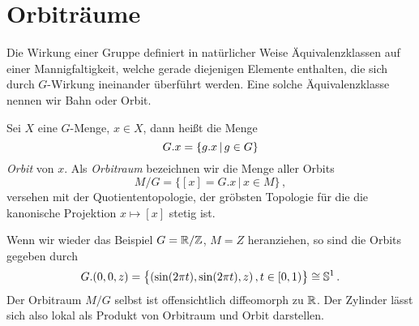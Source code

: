 \section{Orbiträume}
Die Wirkung einer Gruppe definiert in natürlicher
Weise Äquivalenzklassen auf einer Mannigfaltigkeit, welche gerade diejenigen
Elemente enthalten, die sich durch $G$-Wirkung ineinander überführt werden.
Eine solche Äquivalenzklasse nennen wir Bahn oder Orbit. 
\begin{definition}[Orbit]
Sei $X$ eine $G$-Menge, $x\in X$, dann heißt die Menge
\begin{equation}
G . x=\{g . x\,|\,g\in G\}
\end{equation}
\emph{Orbit} von $x$. Als \emph{Orbitraum} bezeichnen wir die Menge aller Orbits
\begin{equation}
M/G=\{[x]=G.x\,|\,x\in M\}\,,
\end{equation}
versehen mit der Quotiententopologie, der gröbsten Topologie für die die
kanonische Projektion $x\mapsto [x]$ stetig ist.
\end{definition}
\begin{beispiel}
Wenn wir wieder das Beispiel $G=\mathbb{R}/\mathbb{Z}$, $M=Z$ heranziehen, so sind die Orbits gegeben durch
\begin{equation}
G.(0,0,z)=\left\{(\sin (2\pi t),\sin (2\pi t),z)\,,t \in
[0,1)\right\}\cong\Sphere^1\,.
\end{equation}
Der Orbitraum $M/G$ selbst ist offensichtlich diffeomorph zu $\mathbb{R}$. Der
Zylinder lässt sich also lokal als Produkt von Orbitraum und Orbit darstellen.
\end{beispiel}
